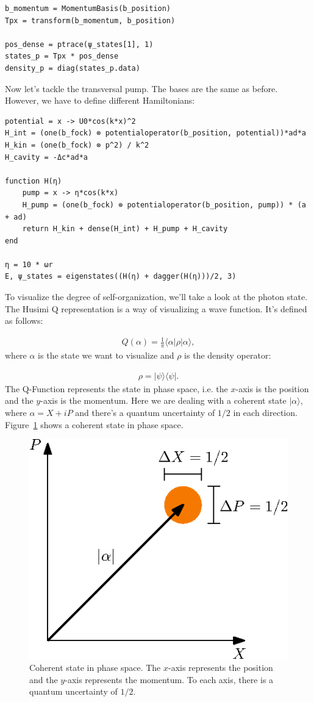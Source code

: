 \begin{lstlisting}
b_momentum = MomentumBasis(b_position)
Tpx = transform(b_momentum, b_position)

pos_dense = ptrace(ψ_states[1], 1)
states_p = Tpx * pos_dense
density_p = diag(states_p.data)
\end{lstlisting}Now let's tackle the transversal pump. The bases are the same as before. However, we have to define different Hamiltonians:

\begin{lstlisting}
potential = x -> U0*cos(k*x)^2
H_int = (one(b_fock) ⊗ potentialoperator(b_position, potential))*ad*a
H_kin = (one(b_fock) ⊗ p^2) / k^2
H_cavity = -Δc*ad*a

function H(η)
    pump = x -> η*cos(k*x)
    H_pump = (one(b_fock) ⊗ potentialoperator(b_position, pump)) * (a + ad)
    return H_kin + dense(H_int) + H_pump + H_cavity
end

η = 10 * ωr
E, ψ_states = eigenstates((H(η) + dagger(H(η)))/2, 3)
\end{lstlisting}To visualize the degree of self-organization, we'll take a look at the photon state. The Husimi Q representation is a way of visualizing a wave function. It's defined as follows:

\begin{align}
Q(\alpha) = \frac{1}{\pi} \langle \alpha | \rho | \alpha \rangle,
\end{align}where $\alpha$ is the state we want to visualize and $\rho$ is the density operator:

\begin{align}
\rho = |\psi \rangle \langle \psi |.
\end{align}The Q-Function represents the state in phase space, i.e. the $x$-axis is the position and the $y$-axis is the momentum. Here we are dealing with a coherent state $|\alpha\rangle$, where $\alpha = X + iP$ and there's a quantum uncertainty of $1/2$ in each direction. Figure~\ref{coherent_state} shows a coherent state in phase space.

\begin{figure}[!htb]
	\centering
	\includegraphics[width=.4\linewidth]{images/coherent_state.eps}
	\caption{Coherent state in phase space. The $x$-axis represents the position and the $y$-axis represents the momentum. To each axis, there is a quantum uncertainty of $1/2$.}
	\label{coherent_state}
\end{figure}
\FloatBarrier

